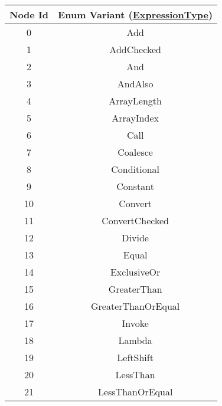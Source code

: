 \documentclass[makeidx]{article}
\begin{document}
\begin{center}
\begin{table}
\begin{tabular}{|c|c|}
Node Id & Enum Variant (\hyperlink{https://docs.microsoft.com/en-us/dotnet/api/system.linq.expressions.expressiontype?view=net-6.0}{ExpressionType}) \\
\hline
0 & Add \\
1 & AddChecked \\
2 & And \\
3 & AndAlso \\
4 & ArrayLength \\
5 & ArrayIndex \\
6 & Call \\
7 & Coalesce \\
8 & Conditional \\
9 & Constant \\
10 & Convert \\
11 & ConvertChecked \\
12 & Divide \\
13 & Equal \\
14 & ExclusiveOr \\
15 & GreaterThan \\
16 & GreaterThanOrEqual \\
17 & Invoke \\
18 & Lambda \\
19 & LeftShift \\
20 & LessThan \\
21 & LessThanOrEqual \\


\end{tabular}
\end{table}
\end{center}
\end{document}
